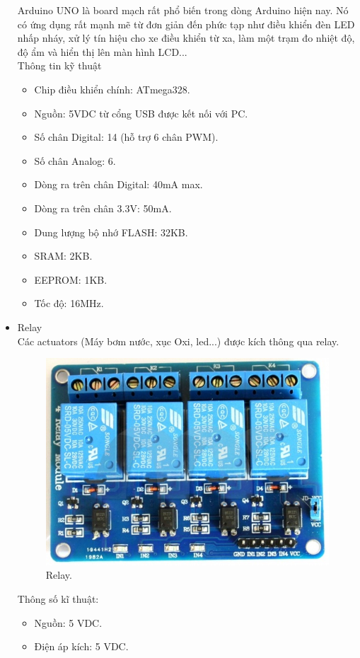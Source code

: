 \documentclass[a4paper,12pt,oneside]{article}
\begin{document}
\begin{itemize}
\noindent Arduino UNO là board mạch rất phổ biến trong dòng Arduino hiện nay. Nó có ứng dụng rất mạnh mẽ từ đơn giản đến phức tạp như điều khiển đèn LED nhấp nháy, xử lý tín hiệu cho xe điều khiển từ xa, làm một trạm đo nhiệt độ, độ ẩm và hiển thị lên màn hình LCD...\\
\noindent Thông tin kỹ thuật
\begin{itemize}
\item Chip điều khiển chính: ATmega328.
\item Nguồn: 5VDC từ cổng USB được kết nối với PC.
\item Số chân Digital: 14 (hỗ trợ 6 chân PWM).
\item Số chân Analog: 6.
\item Dòng ra trên chân Digital: 40mA max.
\item Dòng ra trên chân 3.3V: 50mA.
\item Dung lượng bộ nhớ FLASH: 32KB.
\item SRAM: 2KB.
\item EEPROM: 1KB.
\item Tốc độ: 16MHz.
\end{itemize}

\item Relay\\
\noindent Các actuators (Máy bơm nước, xục Oxi, led...) được kích thông qua relay.\\
\begin{figure}[h!]
\centering
\includegraphics[scale=.6]{hinh/Relay.jpg}
\caption{Relay.}
\end{figure}
\noindent Thông số kĩ thuật:
\begin{itemize}
	\item Nguồn: 5 VDC.
	\item Điện áp kích: 5 VDC.
\end{itemize}


\end{itemize}
\end{document}

